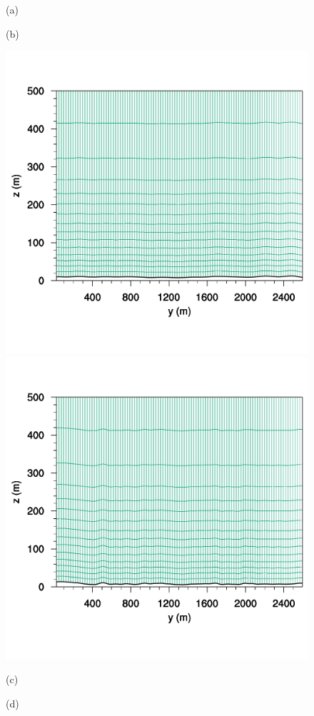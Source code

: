 \begin{figure}[H]
	\centering
	\begin{minipage}{0.5\linewidth}
		\center(a)
	\end{minipage}%
	\begin{minipage}{0.5\linewidth}
		\center(b)
	\end{minipage}%
	
	\includegraphics[width=0.5\linewidth,trim={0cm 4cm -2cm 4cm},clip]{Imagenes/05/hov_mesh_y000001}%
	\includegraphics[width=0.5\linewidth,trim={0cm 4cm -2cm 4cm},clip]{Imagenes/05/hov_mesh_y000033}%
	
	\begin{minipage}{0.5\linewidth}
		\center(c)
	\end{minipage}%
	\begin{minipage}{0.5\linewidth}
		\center(d)
	\end{minipage}%
	

\end{figure}
